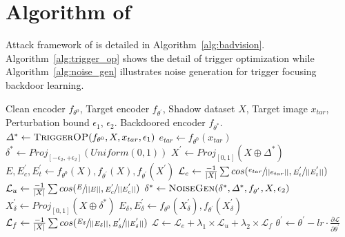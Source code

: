 \section{Algorithm of \project}
\label{appendix:algorithm}
Attack framework of \project is detailed in Algorithm~\ref{alg:badvision}. Algorithm~\ref{alg:trigger_op} shows the detail of trigger optimization while Algorithm~\ref{alg:noise_gen} illustrates noise generation for trigger focusing backdoor learning.
\begin{algorithm}[H]
   \caption{\project}
   \label{alg:badvision}
\begin{algorithmic}[1]
\fontsize{8.5}{11}\selectfont
    Clean encoder $f_{\theta^0}$, Target encoder $f_{\theta^{'}}$, Shadow dataset $X$, Target image $x_{tar}$, Perturbation bound $\epsilon_1$, $\epsilon_2$.
    Backdoored encoder $f_{\theta^{*}}$.
        \STATE $\varDelta^{*} \gets \textsc{TriggerOP}(f_{\theta^0}, X, x_{tar}, \epsilon_1 )$ 
        \STATE $e_{tar} \gets f_{\theta^0}(x_{tar})$
        \STATE $\delta^{*} \gets Proj_{[-\epsilon_2, +\epsilon_2]}(Uniform(0, 1))$
            \STATE $X^{'} \gets Proj_{[0, 1]}(X \oplus \varDelta^{*})$
            \STATE $E, E_c^{'}, E_t^{'} \gets f_{\theta^0}(X), f_{\theta^{'}}(X), f_{\theta^{'}}(X^{'})$
            \STATE $\mathcal{L}_{e} \gets \frac{-1}{|X|} \sum cos(\sfrac{e_{tar}}{||e_{tar}||}, \sfrac{E_t^{'}}{||E_t^{'}||})$
            \STATE $\mathcal{L}_{u} \gets \frac{-1}{|X|} \sum cos(\sfrac{E}{||E||}, \sfrac{E_c^{'}}{||E_c^{'}||})$
            \STATE $\delta^{*}\gets \textsc{NoiseGen}(\delta^{*}, \varDelta^{*}, f_{\theta^{'}}, X, \epsilon_2)$
            \STATE $X_\delta^{'} \gets Proj_{[0, 1]}(X \oplus \delta^{*})$
            \STATE $E_\delta, E_\delta^{'} \gets f_{\theta^0}(X_\delta^{'}), f_{\theta^{'}}(X_\delta^{'})$
            \STATE $\mathcal{L}_{f} \gets \frac{-1}{|X|} \sum cos(\sfrac{E_\delta}{||E_\delta||}, \sfrac{E_\delta^{'}}{||E_\delta^{'}||})$
            \STATE $\mathcal{L} \gets \mathcal{L}_{e} + \lambda_1 \times \mathcal{L}_{u} + \lambda_2 \times \mathcal{L}_{f}$
            \STATE $\theta^{'} \gets \theta^{'} - lr \cdot \frac{\partial \mathcal{L}}{\partial \theta^{'}}$
        \ENDFOR
   \ENDFUNCTION
\end{algorithmic}
\end{algorithm}

